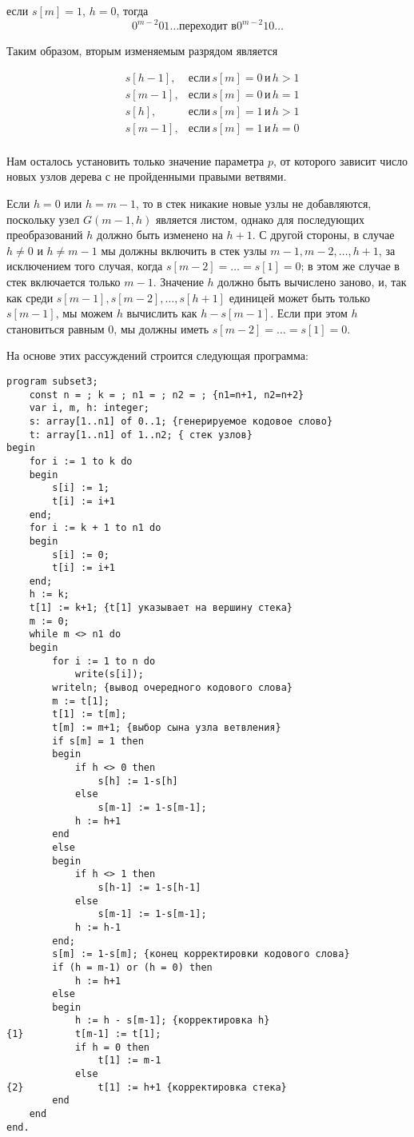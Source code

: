 \documentclass[12pt,a4paper]{article}
\theoremstyle{plain}
\theoremstyle{definition}
\theoremstyle{remark}
\begin{document}
если $s[m]=1$, $h=0$, тогда
\[ 0^{m-2}01\ldots \text{переходит в} 0^{m-2}10\ldots \]

Таким образом, вторым изменяемым разрядом является

\begin{align*}
&s[h-1], &\text{если}\,s[m]=0\,\text{и}\,h>1 \\
&s[m-1], &\text{если}\,s[m]=0\,\text{и}\,h=1 \\
&s[h], &\text{если}\,s[m]=1\,\text{и}\,h>1 \\
&s[m-1], &\text{если}\,s[m]=1\,\text{и}\,h=0 \\
\end{align*}

Нам осталось установить только значение параметра $p$, от которого зависит число новых узлов дерева с не пройденными правыми ветвями.

Если $h=0$ или $h=m-1$, то в стек никакие новые узлы не добавляются, поскольку узел $G(m-1,h)$ является листом, однако для последующих преобразований $h$ должно быть изменено на $h+1$. С другой стороны, в случае $h\ne0$ и $h\ne m-1$ мы должны включить в стек узлы $m-1, m-2,\ldots, h+1$, за исключением того случая, когда $s[m-2]=\ldots=s[1]=0$; в этом же случае в стек включается только $m-1$. Значение $h$ должно быть вычислено заново, и, так как среди $s[m-1], s[m-2],\ldots,s[h+1]$ единицей может быть только $s[m-1]$, мы можем $h$ вычислить как $h-s[m-1]$. Если при этом $h$ становиться равным 0, мы должны иметь $s[m-2]=\ldots=s[1]=0$.

На основе этих рассуждений строится следующая программа:

\begin{verbatim}
program subset3;
    const n = ; k = ; n1 = ; n2 = ; {n1=n+1, n2=n+2}
    var i, m, h: integer;
    s: array[1..n1] of 0..1; {генерируемое кодовое слово}
    t: array[1..n1] of 1..n2; { стек узлов}
begin
    for i := 1 to k do
    begin
        s[i] := 1;
        t[i] := i+1
    end;
    for i := k + 1 to n1 do
    begin
        s[i] := 0;
        t[i] := i+1
    end;
    h := k;
    t[1] := k+1; {t[1] указывает на вершину стека}
    m := 0;
    while m <> n1 do
    begin
        for i := 1 to n do
            write(s[i]);
        writeln; {вывод очередного кодового слова}
        m := t[1];
        t[1] := t[m];
        t[m] := m+1; {выбор сына узла ветвления}
        if s[m] = 1 then
        begin
            if h <> 0 then
                s[h] := 1-s[h]
            else
                s[m-1] := 1-s[m-1];
            h := h+1
        end
        else
        begin
            if h <> 1 then
                s[h-1] := 1-s[h-1]
            else
                s[m-1] := 1-s[m-1];
            h := h-1
        end;
        s[m] := 1-s[m]; {конец корректировки кодового слова}
        if (h = m-1) or (h = 0) then
            h := h+1
        else
        begin
            h := h - s[m-1]; {корректировка h}
{1}         t[m-1] := t[1];
            if h = 0 then
                t[1] := m-1
            else
{2}             t[1] := h+1 {корректировка стека}
        end
    end
end.
\end{verbatim}
\end{document}
